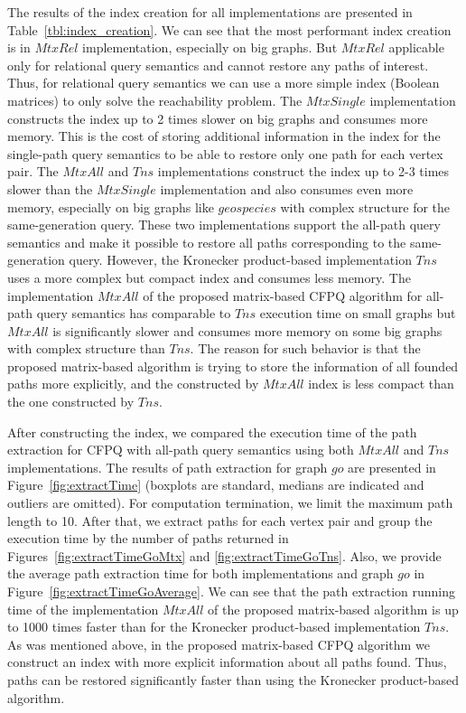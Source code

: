 The results of the index creation for all implementations are presented in Table~\ref{tbl:index_creation}. We can see that the most performant index creation is in $MtxRel$ implementation, especially on big graphs. But $MtxRel$ applicable only for relational query semantics  and cannot restore any paths of interest. Thus, for relational query semantics we can use a more simple index (Boolean matrices) to only solve the reachability problem. The $MtxSingle$ implementation constructs the index up to 2 times slower on big graphs and consumes more memory. This is the cost of storing additional information in the index for the single-path query semantics to be able to restore only one path for each vertex pair. The $MtxAll$ and $Tns$ implementations construct the index up to 2-3 times slower than the $MtxSingle$ implementation and also consumes even more memory, especially on big graphs like $geospecies$ with complex structure for the same-generation query. These two implementations support the all-path query semantics and make it possible to restore all paths corresponding to the same-generation query. However, the Kronecker product-based implementation $Tns$ uses a more complex but compact index and consumes less memory. The implementation $MtxAll$ of the proposed matrix-based CFPQ algorithm for all-path query semantics has comparable to $Tns$ execution time on small graphs but $MtxAll$ is significantly slower and consumes more memory on some big graphs with complex structure than $Tns$. The reason for such behavior is that the proposed matrix-based algorithm is trying to store the information of all founded paths more explicitly, and the constructed by $MtxAll$ index is less compact than the one constructed by $Tns$.

After constructing the index, we compared the execution time of the path extraction for CFPQ with all-path query semantics using both $MtxAll$ and $Tns$ implementations. The results of path extraction for graph $go$ are presented in Figure~\ref{fig:extractTime} (boxplots are standard, medians are indicated and outliers are omitted). For computation termination, we limit the maximum path length to 10. After that, we extract paths for each vertex pair and group the execution time by the number of paths returned in Figures~\ref{fig:extractTimeGoMtx} and \ref{fig:extractTimeGoTns}. Also, we provide the average path extraction time for both implementations and graph $go$ in Figure~\ref{fig:extractTimeGoAverage}. We can see that the path extraction running time of the implementation $MtxAll$ of the proposed matrix-based algorithm is up to 1000 times faster than for the Kronecker product-based implementation $Tns$. As was mentioned above, in the proposed matrix-based CFPQ algorithm we construct an index with more explicit information about all paths found. Thus, paths can be restored significantly faster than using the Kronecker product-based algorithm.

